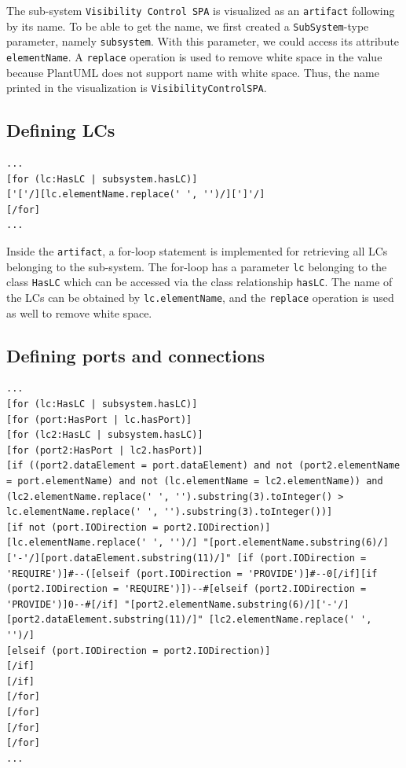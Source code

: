 The sub-system \texttt{Visibility Control SPA} is visualized as an \texttt{artifact} following by its name. To be able to get the name, we first created a \texttt{SubSystem}-type parameter, namely \texttt{subsystem}. With this parameter, we could access its attribute \texttt{elementName}. A \texttt{replace} operation is used to remove white space in the value because PlantUML does not support name with white space. Thus, the name printed in the visualization is \texttt{VisibilityControlSPA}.

\subsection*{Defining LCs}

\begin{lstlisting}[caption=Defining \texttt{component} for the LCs,label=code:defining_lc]
...
[for (lc:HasLC | subsystem.hasLC)]
['['/][lc.elementName.replace(' ', '')/][']'/]
[/for]
...
\end{lstlisting}

Inside the \texttt{artifact}, a for-loop statement is implemented for retrieving all LCs belonging to the sub-system. The for-loop has a parameter \texttt{lc} belonging to the class \texttt{HasLC} which can be accessed via the class relationship \texttt{hasLC}. The name of the LCs can be obtained by \texttt{lc.elementName}, and the \texttt{replace} operation is used as well to remove white space.


\subsection*{Defining ports and connections}

\begin{lstlisting}[caption=Defining ports and connections,label=code:defining_ports_connections]
...
[for (lc:HasLC | subsystem.hasLC)]
[for (port:HasPort | lc.hasPort)]
[for (lc2:HasLC | subsystem.hasLC)]
[for (port2:HasPort | lc2.hasPort)]
[if ((port2.dataElement = port.dataElement) and not (port2.elementName = port.elementName) and not (lc.elementName = lc2.elementName)) and (lc2.elementName.replace(' ', '').substring(3).toInteger() > lc.elementName.replace(' ', '').substring(3).toInteger())]
[if not (port.IODirection = port2.IODirection)]
[lc.elementName.replace(' ', '')/] "[port.elementName.substring(6)/]['-'/][port.dataElement.substring(11)/]" [if (port.IODirection = 'REQUIRE')]#--([elseif (port.IODirection = 'PROVIDE')]#--0[/if][if (port2.IODirection = 'REQUIRE')])--#[elseif (port2.IODirection = 'PROVIDE')]0--#[/if] "[port2.elementName.substring(6)/]['-'/][port2.dataElement.substring(11)/]" [lc2.elementName.replace(' ', '')/]
[elseif (port.IODirection = port2.IODirection)]
[/if]
[/if]
[/for]
[/for]
[/for]
[/for]
...
\end{lstlisting}

